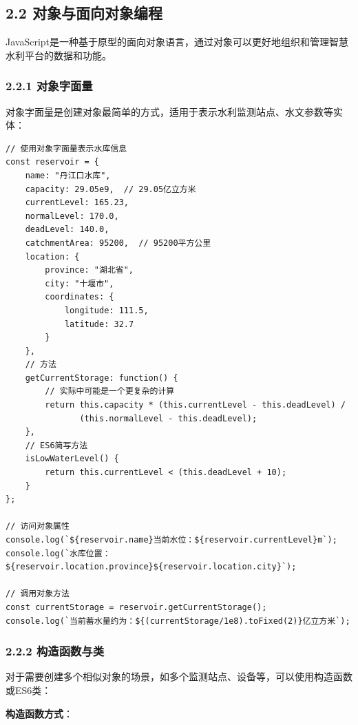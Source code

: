 \subsection{2.2
对象与面向对象编程}\label{ux5bf9ux8c61ux4e0eux9762ux5411ux5bf9ux8c61ux7f16ux7a0b}

JavaScript是一种基于原型的面向对象语言，通过对象可以更好地组织和管理智慧水利平台的数据和功能。

\subsubsection{2.2.1 对象字面量}\label{ux5bf9ux8c61ux5b57ux9762ux91cf}

对象字面量是创建对象最简单的方式，适用于表示水利监测站点、水文参数等实体：

\begin{lstlisting}
// 使用对象字面量表示水库信息
const reservoir = {
    name: "丹江口水库",
    capacity: 29.05e9,  // 29.05亿立方米
    currentLevel: 165.23,
    normalLevel: 170.0,
    deadLevel: 140.0,
    catchmentArea: 95200,  // 95200平方公里
    location: {
        province: "湖北省",
        city: "十堰市",
        coordinates: {
            longitude: 111.5,
            latitude: 32.7
        }
    },
    // 方法
    getCurrentStorage: function() {
        // 实际中可能是一个更复杂的计算
        return this.capacity * (this.currentLevel - this.deadLevel) / 
               (this.normalLevel - this.deadLevel);
    },
    // ES6简写方法
    isLowWaterLevel() {
        return this.currentLevel < (this.deadLevel + 10);
    }
};

// 访问对象属性
console.log(`${reservoir.name}当前水位：${reservoir.currentLevel}m`);
console.log(`水库位置：${reservoir.location.province}${reservoir.location.city}`);

// 调用对象方法
const currentStorage = reservoir.getCurrentStorage();
console.log(`当前蓄水量约为：${(currentStorage/1e8).toFixed(2)}亿立方米`);
\end{lstlisting}

\subsubsection{2.2.2
构造函数与类}\label{ux6784ux9020ux51fdux6570ux4e0eux7c7b}

对于需要创建多个相似对象的场景，如多个监测站点、设备等，可以使用构造函数或ES6类：

\textbf{构造函数方式}：

